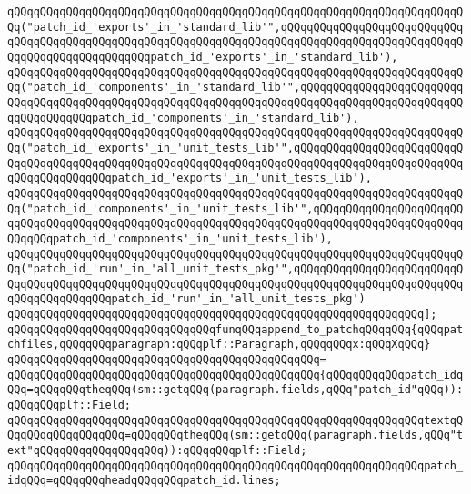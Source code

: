 \verb|qQQqqQQqqQQqqQQqqQQqqQQqqQQqqQQqqQQqqQQqqQQqqQQqqQQqqQQqqQQqqQQqqQQqqQQq("patch_id_'exports'_in_'standard_lib'",qQQqqQQqqQQqqQQqqQQqqQQqqQQqqQQqqQQqqQQqqQQqqQQqqQQqqQQqqQQqqQQqqQQqqQQqqQQqqQQqqQQqqQQqqQQqqQQqqQQqqQQqqQQqqQQqqQQqqQQqpatch_id_'exports'_in_'standard_lib'),|\newline
\verb|qQQqqQQqqQQqqQQqqQQqqQQqqQQqqQQqqQQqqQQqqQQqqQQqqQQqqQQqqQQqqQQqqQQqqQQq("patch_id_'components'_in_'standard_lib'",qQQqqQQqqQQqqQQqqQQqqQQqqQQqqQQqqQQqqQQqqQQqqQQqqQQqqQQqqQQqqQQqqQQqqQQqqQQqqQQqqQQqqQQqqQQqqQQqqQQqqQQqqQQqpatch_id_'components'_in_'standard_lib'),|\newline
\verb|qQQqqQQqqQQqqQQqqQQqqQQqqQQqqQQqqQQqqQQqqQQqqQQqqQQqqQQqqQQqqQQqqQQqqQQq("patch_id_'exports'_in_'unit_tests_lib'",qQQqqQQqqQQqqQQqqQQqqQQqqQQqqQQqqQQqqQQqqQQqqQQqqQQqqQQqqQQqqQQqqQQqqQQqqQQqqQQqqQQqqQQqqQQqqQQqqQQqqQQqqQQqqQQqpatch_id_'exports'_in_'unit_tests_lib'),|\newline
\verb|qQQqqQQqqQQqqQQqqQQqqQQqqQQqqQQqqQQqqQQqqQQqqQQqqQQqqQQqqQQqqQQqqQQqqQQq("patch_id_'components'_in_'unit_tests_lib'",qQQqqQQqqQQqqQQqqQQqqQQqqQQqqQQqqQQqqQQqqQQqqQQqqQQqqQQqqQQqqQQqqQQqqQQqqQQqqQQqqQQqqQQqqQQqqQQqqQQqpatch_id_'components'_in_'unit_tests_lib'),|\newline
\verb|qQQqqQQqqQQqqQQqqQQqqQQqqQQqqQQqqQQqqQQqqQQqqQQqqQQqqQQqqQQqqQQqqQQqqQQq("patch_id_'run'_in_'all_unit_tests_pkg'",qQQqqQQqqQQqqQQqqQQqqQQqqQQqqQQqqQQqqQQqqQQqqQQqqQQqqQQqqQQqqQQqqQQqqQQqqQQqqQQqqQQqqQQqqQQqqQQqqQQqqQQqqQQqqQQqpatch_id_'run'_in_'all_unit_tests_pkg')|\newline
\verb|qQQqqQQqqQQqqQQqqQQqqQQqqQQqqQQqqQQqqQQqqQQqqQQqqQQqqQQqqQQqqQQq];|\newline
\newline
\verb|qQQqqQQqqQQqqQQqqQQqqQQqqQQqqQQqfunqQQqappend_to_patchqQQqqQQq{qQQqpatchfiles,qQQqqQQqparagraph:qQQqplf::Paragraph,qQQqqQQqx:qQQqXqQQq}|\newline
\verb|qQQqqQQqqQQqqQQqqQQqqQQqqQQqqQQqqQQqqQQqqQQqqQQq=|\newline
\verb|qQQqqQQqqQQqqQQqqQQqqQQqqQQqqQQqqQQqqQQqqQQqqQQq{qQQqqQQqqQQqpatch_idqQQq=qQQqqQQqtheqQQq(sm::getqQQq(paragraph.fields,qQQq"patch_id"qQQq)):qQQqqQQqplf::Field;|\newline
\verb|qQQqqQQqqQQqqQQqqQQqqQQqqQQqqQQqqQQqqQQqqQQqqQQqqQQqqQQqqQQqqQQqtextqQQqqQQqqQQqqQQqqQQq=qQQqqQQqtheqQQq(sm::getqQQq(paragraph.fields,qQQq"text"qQQqqQQqqQQqqQQqqQQq)):qQQqqQQqplf::Field;|\newline
\newline
\verb|qQQqqQQqqQQqqQQqqQQqqQQqqQQqqQQqqQQqqQQqqQQqqQQqqQQqqQQqqQQqqQQqpatch_idqQQq=qQQqqQQqheadqQQqqQQqpatch_id.lines;|\newline
